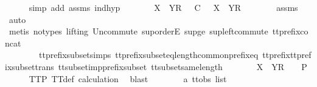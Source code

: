 \begin{isabellebody}
\ \ \ \ \isamarkupfalse%
\ {\isacharparenleft}simp\ add{\isacharcolon}\ {\isasymsigma}{\isacharunderscore}assms\ ind{\isacharunderscore}hyp{\isacharparenright}\isanewline
\ \ \isamarkupfalse%
\ \isamarkupfalse%
\ {\isachardoublequoteopen}{\isasymrho}{\isacharprime}\ {\isacharat}\ {\isacharbrackleft}X\ {\isasymunion}\ Y{\isacharbrackright}\isactrlsub R\ {\isacharhash}\ {\isasymsigma}{\isacharprime}\ {\isasymlesssim}\isactrlsub C\ {\isasymrho}{\isacharprime}{\isacharprime}\ {\isacharat}\ {\isacharbrackleft}X{\isacharprime}\ {\isasymunion}\ Y{\isacharbrackright}\isactrlsub R\ {\isacharhash}\ {\isasymsigma}{\isacharprime}{\isacharprime}{\isachardoublequoteclose}\isanewline
\ \ \ \ \isamarkupfalse%
\ {\isasymsigma}{\isacharunderscore}assms\ \isamarkupfalse%
\ auto\isanewline
\ \ \ \ \isamarkupfalse%
\ {\isacharparenleft}metis\ {\isacharparenleft}no{\isacharunderscore}types{\isacharcomma}\ lifting{\isacharparenright}\ Un{\isacharunderscore}commute\ sup{\isachardot}orderE\ sup{\isacharunderscore}ge{}\ sup{\isacharunderscore}left{\isacharunderscore}commute\ tt{\isacharunderscore}prefix{\isacharunderscore}concat\ \isanewline
\ \ \ \ \ \ \ \ tt{\isacharunderscore}prefix{\isacharunderscore}subset{\isachardot}simps{\isacharparenleft}{}{\isacharparenright}\ tt{\isacharunderscore}prefix{\isacharunderscore}subset{\isacharunderscore}eq{\isacharunderscore}length{\isacharunderscore}common{\isacharunderscore}prefix{\isacharunderscore}eq\ tt{\isacharunderscore}prefix{\isacharunderscore}tt{\isacharunderscore}prefix{\isacharunderscore}subset{\isacharunderscore}trans\ tt{\isacharunderscore}subset{\isacharunderscore}imp{\isacharunderscore}prefix{\isacharunderscore}subset\ tt{\isacharunderscore}subset{\isacharunderscore}same{\isacharunderscore}length{\isacharparenright}\isanewline
\ \ \isamarkupfalse%
\ \isamarkupfalse%
\ {\isachardoublequoteopen}{\isasymrho}{\isacharprime}\ {\isacharat}\ {\isacharbrackleft}X\ {\isasymunion}\ Y{\isacharbrackright}\isactrlsub R\ {\isacharhash}\ {\isasymsigma}{\isacharprime}\ {\isasymin}\ P{\isachardoublequoteclose}\isanewline
\ \ \ \ \isamarkupfalse%
\ TT{}{\isacharunderscore}P\ TT{}{\isacharunderscore}def\ calculation\ \isamarkupfalse%
\ blast\isanewline
{}\isamarkupfalse%
\isanewline
\ \ \isamarkupfalse%
\ {\isasymsigma}\ {\isasymrho}{\isacharprime}\ {\isasymsigma}{\isacharprime}\ {\isacharcolon}{\isacharcolon}\ {\isachardoublequoteopen}{\isacharprime}a\ ttobs\ list{\isachardoublequoteclose}\isanewline

\end{isabellebody}
